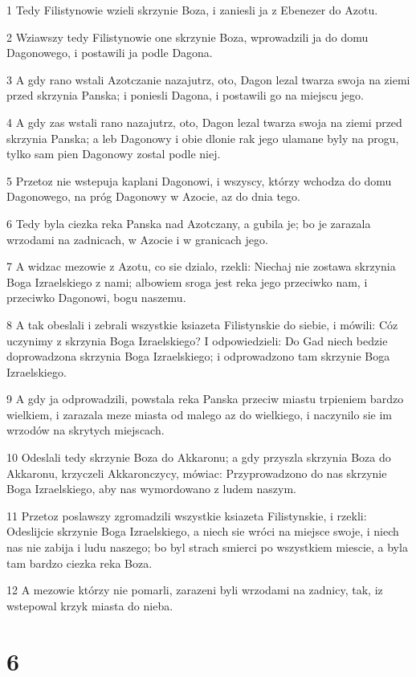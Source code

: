 \par 1 Tedy Filistynowie wzieli skrzynie Boza, i zaniesli ja z Ebenezer do Azotu.
\par 2 Wziawszy tedy Filistynowie one skrzynie Boza, wprowadzili ja do domu Dagonowego, i postawili ja podle Dagona.
\par 3 A gdy rano wstali Azotczanie nazajutrz, oto, Dagon lezal twarza swoja na ziemi przed skrzynia Panska; i poniesli Dagona, i postawili go na miejscu jego.
\par 4 A gdy zas wstali rano nazajutrz, oto, Dagon lezal twarza swoja na ziemi przed skrzynia Panska; a leb Dagonowy i obie dlonie rak jego ulamane byly na progu, tylko sam pien Dagonowy zostal podle niej.
\par 5 Przetoz nie wstepuja kaplani Dagonowi, i wszyscy, którzy wchodza do domu Dagonowego, na próg Dagonowy w Azocie, az do dnia tego.
\par 6 Tedy byla ciezka reka Panska nad Azotczany, a gubila je; bo je zarazala wrzodami na zadnicach, w Azocie i w granicach jego.
\par 7 A widzac mezowie z Azotu, co sie dzialo, rzekli: Niechaj nie zostawa skrzynia Boga Izraelskiego z nami; albowiem sroga jest reka jego przeciwko nam, i przeciwko Dagonowi, bogu naszemu.
\par 8 A tak obeslali i zebrali wszystkie ksiazeta Filistynskie do siebie, i mówili: Cóz uczynimy z skrzynia Boga Izraelskiego? I odpowiedzieli: Do Gad niech bedzie doprowadzona skrzynia Boga Izraelskiego; i odprowadzono tam skrzynie Boga Izraelskiego.
\par 9 A gdy ja odprowadzili, powstala reka Panska przeciw miastu trpieniem bardzo wielkiem, i zarazala meze miasta od malego az do wielkiego, i naczynilo sie im wrzodów na skrytych miejscach.
\par 10 Odeslali tedy skrzynie Boza do Akkaronu; a gdy przyszla skrzynia Boza do Akkaronu, krzyczeli Akkaronczycy, mówiac: Przyprowadzono do nas skrzynie Boga Izraelskiego, aby nas wymordowano z ludem naszym.
\par 11 Przetoz poslawszy zgromadzili wszystkie ksiazeta Filistynskie, i rzekli: Odeslijcie skrzynie Boga Izraelskiego, a niech sie wróci na miejsce swoje, i niech nas nie zabija i ludu naszego; bo byl strach smierci po wszystkiem miescie, a byla tam bardzo ciezka reka Boza.
\par 12 A mezowie którzy nie pomarli, zarazeni byli wrzodami na zadnicy, tak, iz wstepowal krzyk miasta do nieba.

\chapter{6}

